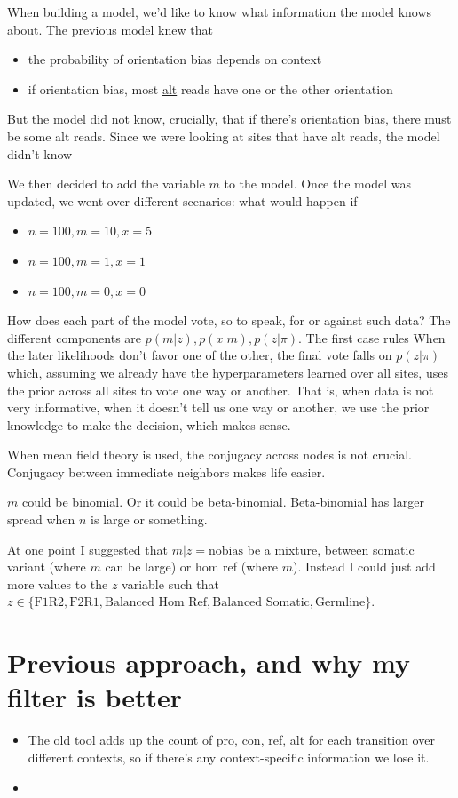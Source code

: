 \documentclass[a4paper]{article}
\begin{document}
When building a model, we'd like to know what information the model knows about. The previous model knew that 

\begin{itemize}
\item the probability of orientation bias depends on context
\item if orientation bias, most \underline{alt} reads have one or the other orientation
\end{itemize}

But the model did not know, crucially, that if there's orientation bias, there must be some alt reads. Since we were looking at sites that have alt reads, the model didn't know 

We then decided to add the variable $m$ to the model.  Once the model was updated, we went over different scenarios: what would happen if 
\begin{itemize}
\item $n = 100, m = 10, x = 5$ 
\item $n = 100, m = 1, x = 1$
\item $n = 100, m = 0, x = 0$
\end{itemize}

How does each part of the model vote, so to speak, for or against such data? The different components are $p(m|z), p(x|m), p(z | \pi)$. The first case rules 
When the later likelihoods don't favor one of the other, the final vote falls on $p(z | \pi)$ which, assuming we already have the hyperparameters learned over all sites, uses the prior across all sites to vote one way or another. That is, when data is not very informative, when it doesn't tell us one way or another, we use the prior knowledge to make the decision, which makes sense.

When mean field theory is used, the conjugacy across nodes is not crucial. Conjugacy between immediate neighbors makes life easier.

$m$ could be binomial. Or it could be beta-binomial. Beta-binomial has larger spread when $n$ is large or something. 

At one point I suggested that $m|z = \mathrm{no bias}$ be a mixture, between somatic variant (where $m$ can be large) or hom ref (where $m$). Instead I could just add more values to the $z$ variable such that $z \in \{ \text{F1R2}, \text{F2R1}, \text{Balanced Hom Ref}, \text{Balanced Somatic}, \text{Germline} \}$.

\section{Previous approach, and why my filter is better}
\begin{itemize}
\item The old tool adds up the count of pro, con, ref, alt for each transition over different contexts, so if there's any context-specific information we lose it.
\item 
\end{itemize}
\end{document}
